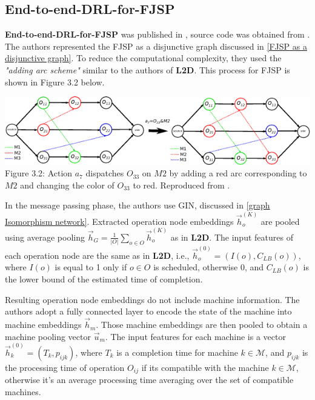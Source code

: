 \subsection{End-to-end-DRL-for-FJSP} 

\textbf{End-to-end-DRL-for-FJSP} was published in \cite{LEI2022117796}, source code was obtained from \cite{github_end_to_end_drl_for_fjsp}. The authors represented the FJSP as a disjunctive graph discussed in \ref{FJSP as a disjunctive graph}. To reduce the computational complexity, they used the \textit{"adding arc scheme"} similar to the authors of \textbf{L2D}. This process for FJSP is shown in Figure 3.2 below.
\begin{center}
    \includegraphics[width=\linewidth]{images/fjsp_adding_arcs.pdf}\\
    Figure 3.2: Action $a_7$ dispatches $O_{33}$ on $M2$ by adding a red arc corresponding to $M2$ and changing the color of $O_{33}$ to red. Reproduced from \cite{LEI2022117796}.
\end{center}
In the message passing phase, the authors use GIN, discussed in \ref{graph Isomorphism network}. Extracted operation node embeddings $\vec{h}_o^{(K)}$ are pooled using average pooling $\vec{h}_G = \frac{1}{|O|} \sum_{o \in O} \vec{h}_o^{(K)}$ as in \textbf{L2D}. The input features of each operation node are the same as in \textbf{L2D}, i.e., $\vec{h}_o^{(0)} = (I(o), C_{LB}(o))$, where $I(o)$ is equal to 1 only if $o \in O$ is scheduled, otherwise 0, and $C_{LB}(o)$ is the lower bound of the estimated time of completion.
\par
Resulting operation node embeddings do not include machine information. The authors adopt a fully connected layer to encode the state of the machine into machine embeddings $\vec{h}_m$. Those machine embeddings are then pooled to obtain a machine pooling vector $\vec{u}_m$. The input features for each machine is a vector $\vec{h}^{(0)}_k = \left ( T_k,p_{ijk}\right )$, where $T_k$ is a completion time for machine $k \in \mathcal{M}$, and $p_{ijk}$ is the processing time of operation $O_{ij}$ if its compatible with the machine $k \in \mathcal{M}$, otherwise it's an average processing time averaging over the set of compatible machines. 
